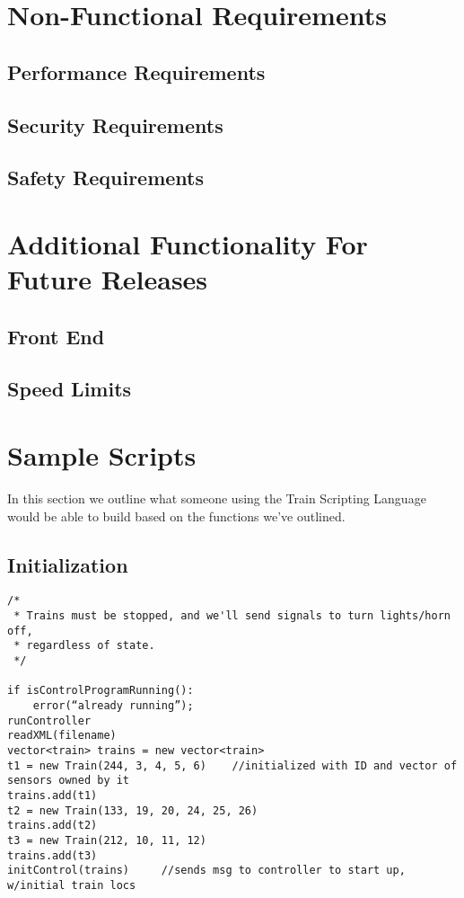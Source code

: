 \documentclass[a4paper,11pt,notitlepage]{article}
\def\TSL{Train Scripting Language\xspace}
\begin{document}
\newpage
\section{Non-Functional Requirements}
\subsection{Performance Requirements}
\subsection{Security Requirements}
\subsection{Safety Requirements}

\newpage
\section{Additional Functionality For Future Releases}
\subsection{Front End}
\subsection{Speed Limits}

\newpage
\section{Sample Scripts}
In this section we outline what someone using the \TSL would be able to build based on the functions we've outlined.

\subsection{Initialization}
\begin{verbatim}
/*
 * Trains must be stopped, and we'll send signals to turn lights/horn off,
 * regardless of state.
 */

if isControlProgramRunning():
    error(“already running”);
runController
readXML(filename)
vector<train> trains = new vector<train>
t1 = new Train(244, 3, 4, 5, 6)    //initialized with ID and vector of sensors owned by it
trains.add(t1)
t2 = new Train(133, 19, 20, 24, 25, 26)
trains.add(t2)
t3 = new Train(212, 10, 11, 12)
trains.add(t3)
initControl(trains)     //sends msg to controller to start up, w/initial train locs
\end{verbatim}
\end{document}
